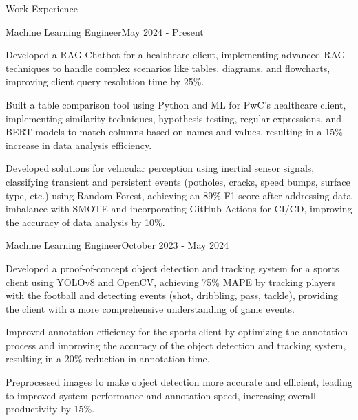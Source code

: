 \documentclass{resume} %
\begin{document}
    \begin{rSection}{Work Experience}
                    \begin{rSubsection}
                {Machine Learning Engineer}{May 2024 - Present}
                                    {}
                                {}
                                    \item Developed a RAG Chatbot for a healthcare client, implementing advanced RAG techniques to handle complex scenarios like tables, diagrams, and flowcharts, improving client query resolution time by 25\%.
                                    \item Built a table comparison tool using Python and ML for PwC's healthcare client, implementing similarity techniques, hypothesis testing, regular expressions, and BERT models to match columns based on names and values, resulting in a 15\% increase in data analysis efficiency.
                                    \item Developed solutions for vehicular perception using inertial sensor signals, classifying transient and persistent events (potholes, cracks, speed bumps, surface type, etc.) using Random Forest, achieving an 89\% F1 score after addressing data imbalance with SMOTE and incorporating GitHub Actions for CI/CD, improving the accuracy of data analysis by 10\%.
                            \end{rSubsection}
                    \begin{rSubsection}
                {Machine Learning Engineer}{October 2023 - May 2024}
                                    {}
                                {}
                                    \item Developed a proof{-}of{-}concept object detection and tracking system for a sports client using YOLOv8 and OpenCV, achieving 75\% MAPE by tracking players with the football and detecting events (shot, dribbling, pass, tackle), providing the client with a more comprehensive understanding of game events.
                                    \item Improved annotation efficiency for the sports client by optimizing the annotation process and improving the accuracy of the object detection and tracking system, resulting in a 20\% reduction in annotation time.
                                    \item Preprocessed images to make object detection more accurate and efficient, leading to improved system performance and annotation speed, increasing overall productivity by 15\%.

\end{rSubsection}
\end{rSection}
\end{document}
